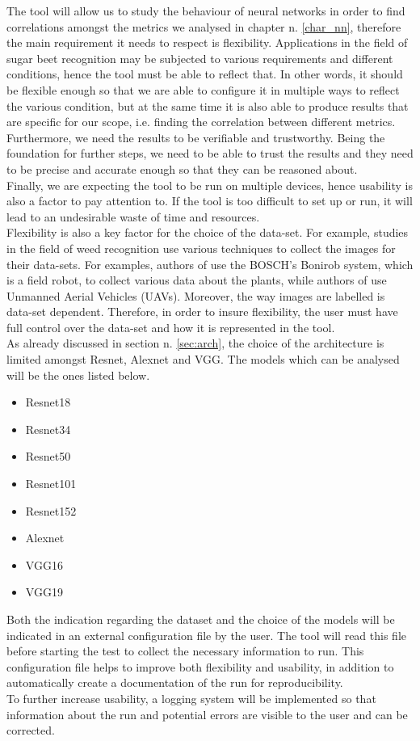 The tool will allow us to study the behaviour of neural networks in order to find correlations amongst the metrics we analysed in chapter n. \ref{char_nn}, therefore the main requirement it needs to respect is flexibility. Applications in the field of sugar beet recognition may be subjected to various requirements and different conditions, hence the tool must be able to reflect that. In other words, it should be flexible enough so that we are able to configure it in multiple ways to reflect the various condition, but at the same time it is also able to produce results that are specific for our scope, i.e. finding the correlation between different metrics. Furthermore, we need the results to be verifiable and trustworthy. Being the foundation for further steps, we need to be able to trust the results and they need to be precise and accurate enough so that they can be reasoned about. \\
Finally, we are expecting the tool to be run on multiple devices, hence usability is also a factor to pay attention to. If the tool is too difficult to set up or run, it will lead to an undesirable waste of time and resources. \\
Flexibility is also a key factor for the choice of the data-set. For example,  studies in the field of weed recognition use various techniques to collect the images for their data-sets. For examples, authors of \cite{lu_survey_2020} use the BOSCH’s Bonirob system, which is a field robot, to collect various data about the plants, while authors of \cite{rs10111690} use Unmanned Aerial Vehicles (UAVs). Moreover, the way images are labelled is data-set dependent. 
Therefore, in order to insure flexibility, the user must have full control over the data-set and how it is represented in the tool. \\
As already discussed in section n. \ref{sec:arch},  the choice of the architecture is limited amongst Resnet, Alexnet and VGG. The models which can be analysed will be the ones listed below. 
\begin{itemize}
\item Resnet18
\item Resnet34
\item Resnet50
\item Resnet101
\item Resnet152
\item Alexnet
\item VGG16
\item VGG19
\end{itemize}
Both the indication regarding the dataset and the choice of the models will be indicated in an external configuration file by the user. The tool will read this file before starting the test to collect the necessary information to run. This configuration file helps to improve both flexibility and usability, in addition to automatically create a documentation of the run for reproducibility. \\
To further increase usability, a logging system will be implemented so that information about the run and potential errors are visible to the user and can be corrected. \\

